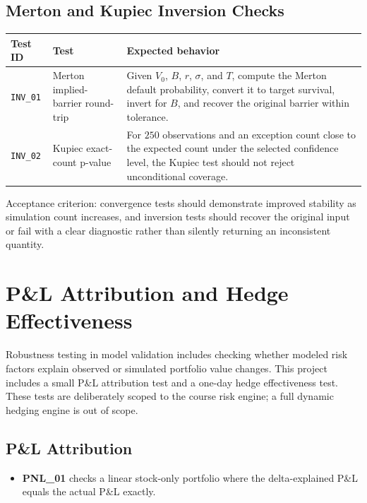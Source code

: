 \documentclass[11pt]{article}
\newcommand{\code}[1]{\texttt{#1}}
\begin{document}
\subsection{Merton and Kupiec Inversion Checks}

\begin{center}
\begin{tabular}{L{2.2cm}L{4.8cm}L{6cm}}
\toprule
\textbf{Test ID} & \textbf{Test} & \textbf{Expected behavior} \\
\midrule
\code{INV\_01} & Merton implied-barrier round-trip & Given $V_0$, $B$, $r$, $\sigma$, and $T$, compute the Merton default probability, convert it to target survival, invert for $B$, and recover the original barrier within tolerance. \\
\code{INV\_02} & Kupiec exact-count p-value & For $250$ observations and an exception count close to the expected count under the selected confidence level, the Kupiec test should not reject unconditional coverage. \\
\bottomrule
\end{tabular}
\end{center}

Acceptance criterion: convergence tests should demonstrate improved
stability as simulation count increases, and inversion tests should
recover the original input or fail with a clear diagnostic rather than
silently returning an inconsistent quantity.

\section{P\&L Attribution and Hedge Effectiveness}
\label{sec:pnl-hedge-effectiveness}

Robustness testing in model validation includes checking whether modeled
risk factors explain observed or simulated portfolio value changes.  This
project includes a small P\&L attribution test and a one-day hedge
effectiveness test.  These tests are deliberately scoped to the course
risk engine; a full dynamic hedging engine is out of scope.

\subsection{P\&L Attribution}

\begin{itemize}
  \item \textbf{PNL\_01} checks a linear stock-only portfolio where the
    delta-explained P\&L equals the actual P\&L exactly.
\end{itemize}
\end{document}
